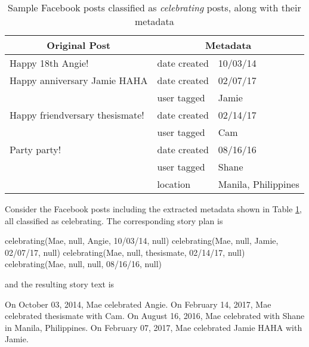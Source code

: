 \begin{table}[ph!]   
	\centering
	\caption{Sample Facebook posts classified as \textit{celebrating} posts, along with their metadata} \vspace{0.25em}
	\begin{tabular}  {|p{2in}|p{1.5in}|p{1.5in}|}  \hline
    \multicolumn{1}{|c|}{Original Post} & \multicolumn{2}{c|}{Metadata}\\ \hline
	Happy 18th Angie! &  date created & 10/03/14 \\ \hline
	
	{Happy anniversary Jamie HAHA} &  {date created} &{02/07/17} \\\cline{2-1}
	& {user tagged} & {Jamie} \\\hline
	
	{Happy friendversary thesismate!} &  {date created} & {02/14/17} \\\cline{2-1}
	&  {user tagged} &{Cam} \\\hline
	
	{Party party!} &  {date created} & {08/16/16} \\\cline{2-2}
	&  {user tagged} & {Shane} \\\cline{2-2}
	&  {location} & {Manila, Philippines} \\\hline
	
	\end{tabular}
	\label{tab:GrammarRules-celeb}
\end{table}

Consider the Facebook posts including the extracted metadata shown in Table \ref{tab:GrammarRules-celeb}, all classified as celebrating. The corresponding story plan is

\begin{center} celebrating(Mae, null, Angie, 10/03/14, null) \newline
	celebrating(Mae, null, Jamie, 02/07/17, null) \newline
	celebrating(Mae, null, thesismate, 02/14/17, null) \newline
	celebrating(Mae, null, null, 08/16/16, null) \end{center}

and the resulting story text is

\begin{center} On October 03, 2014, Mae celebrated Angie. On February 14, 2017, Mae celebrated thesismate with Cam. On August 16, 2016, Mae celebrated with Shane in Manila, Philippines. On February 07, 2017, Mae celebrated Jamie HAHA with Jamie. \end{center}

